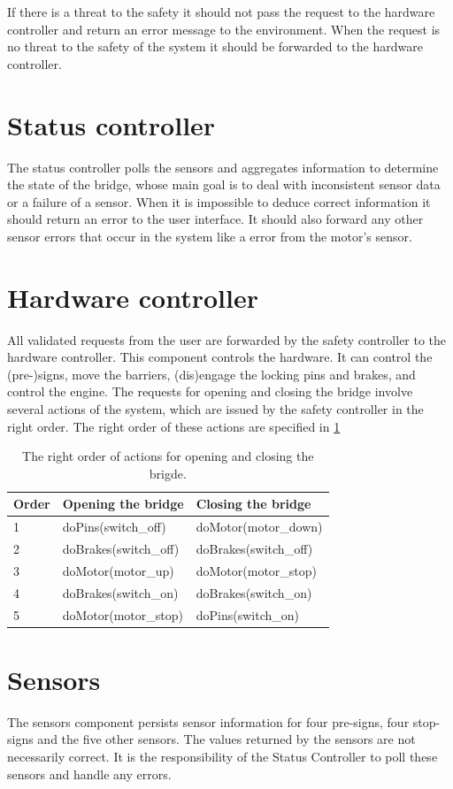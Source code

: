 		If there is a threat to the safety it should not pass the request to the hardware controller and return an error message to the environment. 
		When the request is no threat to the safety of the system it should be forwarded to the hardware controller.
	
	
	
	\section{Status controller} \label{sec:arch:status}
		The status controller polls the sensors and aggregates information to determine the
		state of the bridge, whose main goal is to deal with inconsistent sensor data or a failure of a sensor. 
		When it is impossible to deduce correct information it should return an error to the user interface.
		It should also forward any other sensor errors that occur in the system like a error from the motor's sensor.
	
	
	
	\section{Hardware controller}
		All validated requests from the user are forwarded by the safety controller to the hardware controller.
		This component controls the hardware. 
		It can control the (pre-)signs, move the barriers, (dis)engage the locking pins and brakes, and control the engine. 
		The requests for opening and closing the bridge involve several actions of the system, which are issued by the safety controller in the right order. 
		The right order of these actions are specified in \cref{tbl:actionorder}
	
	\begin{table}[!htbp]
		\begin{center}
		\begin{tabular}{| l | l | l |}
			\hline
			Order & Opening the bridge 	& Closing the bridge	\\
			\hline
			1 & doPins(switch\_off) 	&	doMotor(motor\_down)	\\
			2 & doBrakes(switch\_off)	&	doBrakes(switch\_off)	\\
			3 & doMotor(motor\_up)		&	doMotor(motor\_stop)\\
			4 & doBrakes(switch\_on)	&	doBrakes(switch\_on)\\
			5 & doMotor(motor\_stop)	&	doPins(switch\_on)	\\
			\hline
		\end{tabular}
		\caption{The right order of actions for opening and closing the brigde.}
		\label{tbl:actionorder}
		\end{center}
	\end{table}

	\section{Sensors}
		The sensors component persists sensor information for four pre-signs, four stop-signs and the five other sensors. 
		The values returned by the sensors are not necessarily correct.
		It is the responsibility of the Status Controller to poll these sensors and handle any errors.

